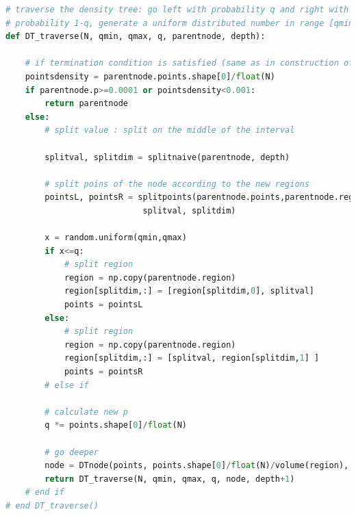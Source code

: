 \documentclass{article}
\begin{document}
\begin{lstlisting}[language=Python]
# traverse the density tree: go left with probability q and right with 
# probability 1-q, generate a uniform distributed number in range [qmin, qmax)
def DT_traverse(N, qmin, qmax, q, parentnode, depth):

    # if termination condition is satisfied (same as in construction of DT)
    pointsdensity = parentnode.points.shape[0]/float(N)
    if parentnode.p>=0.0001 or pointsdensity<0.001: 
        return parentnode
    else:
        # split value : split on the middle of the interval
    
        splitval, splitdim = splitnaive(parentnode, depth)

        # split poins of the node according to the new regions
        pointsL, pointsR = splitpoints(parentnode.points,parentnode.region,\
        					splitval, splitdim)
        
        x = random.uniform(qmin,qmax)        
        if x<=q:
            # split region
            region = np.copy(parentnode.region)
            region[splitdim,:] = [region[splitdim,0], splitval]            
            points = pointsL
        else:
            # split region
            region = np.copy(parentnode.region)       
            region[splitdim,:] = [splitval, region[splitdim,1] ]
            points = pointsR
        # else if
        
        # calculate new p
        q *= points.shape[0]/float(N)
        
        # go deeper
        node = DTnode(points, points.shape[0]/float(N)/volume(region), region)
        return DT_traverse(N, qmin, qmax, q, node, depth+1)
    # end if    
# end DT_traverse()
\end{lstlisting}        
 
\end{document}
